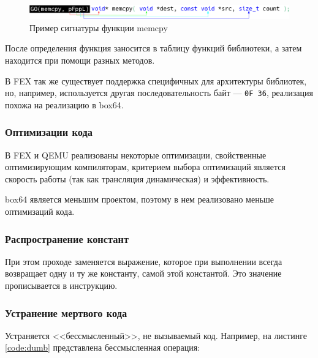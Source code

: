 \begin{figure}[hbtp]
	\centering
	\includegraphics[width=\textwidth]{img/function.eps}
	\caption{Пример сигнатуры функции memcpy}
	\label{fig:box64sig}
\end{figure}

После определения функция заносится в таблицу функций библиотеки, а затем находится при помощи разных методов. \cite{box64_deep}

В FEX так же существует поддержка специфичных для архитектуры библиотек, но, например, используется другая последовательность байт --- \texttt{0F 36}, реализация похожа на реализацию в box64.

\subsubsection{Оптимизации кода}

В FEX и QEMU реализованы некоторые оптимизации, свойственные оптимизирующим компиляторам, критерием выбора оптимизаций является скорость работы (так как трансляция динамическая) и эффективность.

box64 является меньшим проектом, поэтому в нем реализовано меньше оптимизаций кода.

\subsubsection{Распространение констант}

При этом проходе заменяется выражение, которое при выполнении всегда возвращает одну и ту же константу, самой этой константой. Это значение прописывается в инструкцию.

\subsubsection{Устранение мертвого кода}

Устраняется <<бессмысленный>>, не вызываемый код.
Например, на листинге \ref{code:dumb} представлена бессмысленная операция:

